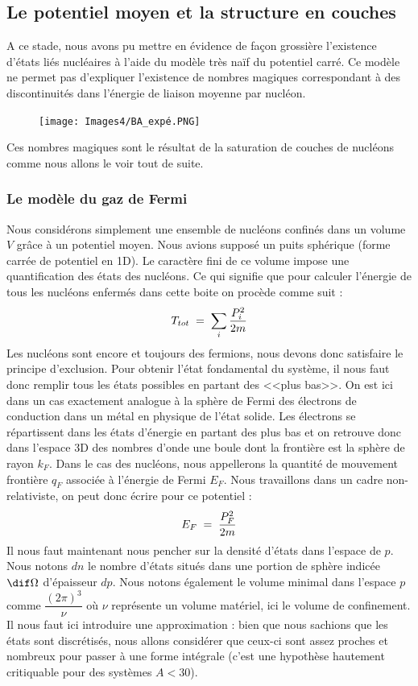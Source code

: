 \subsection{Le potentiel moyen et la structure en couches}
A ce stade, nous avons pu mettre en évidence de façon grossière l'existence d'états liés nucléaires à l'aide du modèle très naïf du potentiel carré. Ce modèle ne permet pas d'expliquer l'existence de nombres magiques correspondant à des discontinuités dans l'énergie de liaison moyenne par nucléon.
\begin{figure}[H]
    \centering
    \texttt{[image: Images4/BA\_expé.PNG]}
    \caption{}
\end{figure}
Ces nombres magiques sont le résultat de la saturation de couches de nucléons comme nous allons le voir tout de suite.
\subsubsection{Le modèle du gaz de Fermi}
Nous considérons simplement une ensemble de nucléons confinés dans un volume $V$ grâce à un potentiel moyen. Nous avions supposé un puits sphérique (forme carrée de potentiel en 1D). Le caractère fini de ce volume impose une quantification des états des nucléons. Ce qui signifie que pour calculer l'énergie de tous les nucléons enfermés dans cette boite on procède comme suit :
\begin{equation*}
    T_{tot} \; = \; \sum_i \dfrac{P_i^2}{2m}
\end{equation*}
Les nucléons sont encore et toujours des fermions, nous devons donc satisfaire le principe d'exclusion. Pour obtenir l'état fondamental du système, il nous faut donc remplir tous les états possibles en partant des <<plus bas>>. On est ici dans un cas exactement analogue à la sphère de Fermi des électrons de conduction dans un métal en physique de l'état solide. Les électrons se répartissent dans les états d'énergie en partant des plus bas et on retrouve donc dans l'espace 3D des nombres d'onde une boule dont la frontière est la sphère de rayon $k_F$. Dans le cas des nucléons, nous appellerons la quantité de mouvement frontière $q_F$ associée à l'énergie de Fermi $E_F$. Nous travaillons dans un cadre non-relativiste, on peut donc écrire pour ce potentiel :
\begin{equation*}
    E_F \; = \; \dfrac{P_F^2}{2m}
\end{equation*}
Il nous faut maintenant nous pencher sur la densité d'états dans l'espace de $p$. Nous notons $dn$ le nombre d'états situés dans une portion de sphère indicée $\dif\Omega$ d'épaisseur $dp$. Nous notons également le volume minimal dans l'espace $p$ comme $\dfrac{(2\pi)^3}{\nu}$ où $\nu$ représente un volume matériel, ici le volume de confinement. Il nous faut ici introduire une approximation : bien que nous sachions que les états sont discrétisés, nous allons considérer que ceux-ci sont assez proches et nombreux pour passer à une forme intégrale (c'est une hypothèse hautement critiquable pour des systèmes $A<30$).
